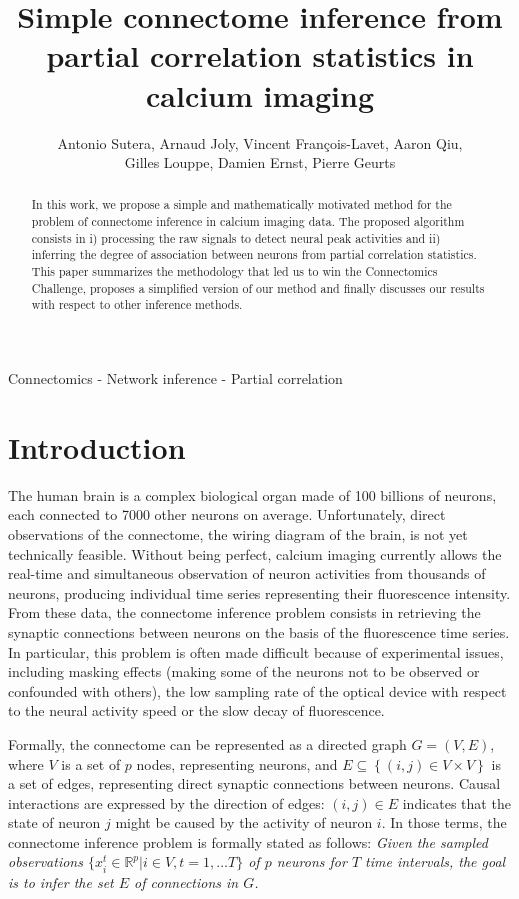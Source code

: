 \documentclass[wcp]{jmlr}
\title{Simple connectome inference from partial correlation statistics in calcium imaging}
\author{Antonio Sutera,
        Arnaud Joly,
        Vincent François-Lavet,
        Aaron Qiu, \\
        Gilles Louppe,
        Damien Ernst,
        Pierre Geurts}
\begin{document}
\maketitle

\begin{abstract}
In this work, we propose a simple and mathematically motivated method for the
problem of connectome inference in calcium imaging data. The proposed algorithm
consists in i) processing the raw signals to detect neural peak activities and ii)
inferring the degree of association between neurons from partial correlation
statistics.  This paper summarizes the methodology that led us to win the
Connectomics Challenge, proposes a simplified version of our method and finally
discusses our results with respect to other inference methods.
\end{abstract}

\begin{keywords}
Connectomics - Network inference - Partial correlation
\end{keywords}


\section{Introduction}\label{sec:intro}

The human brain is a complex biological organ made of 100 billions of neurons,
each connected to 7000 other neurons on average. Unfortunately, direct
observations of the connectome, the wiring diagram of the brain, is not yet
technically feasible. Without being perfect, calcium imaging currently allows
the real-time and simultaneous observation of neuron activities from thousands
of neurons, producing individual time series representing their fluorescence
intensity. From these data, the connectome inference problem consists in
retrieving the synaptic connections between neurons on the basis of the
fluorescence time series. In particular, this problem is often made difficult
because of experimental issues, including masking effects (making some of the
neurons not to be observed or confounded with others), the low sampling rate of
the optical device with respect to the neural activity speed or the slow decay
of fluorescence.

Formally, the connectome can be represented as a directed graph $G=(V,E)$,
where $V$ is a set of $p$ nodes, representing neurons, and $E \subseteq
\left\{(i, j) \in V \times V\right\}$ is a set of edges, representing direct
synaptic connections between neurons. Causal interactions are expressed by the
direction of edges: $(i, j) \in E$ indicates that the state of neuron $j$ might
be caused by the activity of neuron $i$. In those terms,  the connectome
inference problem is formally stated as follows:  \textit{Given the sampled
observations $\{ x^t_i \in \mathbb{R}^{p} | i \in V, t = 1, \dots T \}$ of $p$
neurons for $T$ time intervals, the goal is to infer the set $E$ of connections in $G$.}
\end{document}
